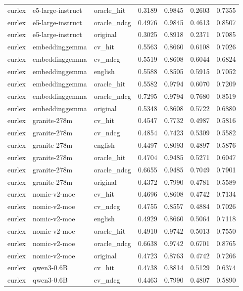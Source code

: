 \begin{tabular}{lllrrrr}
eurlex & e5-large-instruct & oracle\_hit & 0.3189 & 0.9845 & 0.2603 & 0.7355 \\
eurlex & e5-large-instruct & oracle\_ndcg & 0.4976 & 0.9845 & 0.4613 & 0.8507 \\
eurlex & e5-large-instruct & original & 0.3025 & 0.8918 & 0.2371 & 0.7085 \\
eurlex & embeddinggemma & cv\_hit & 0.5563 & 0.8660 & 0.6108 & 0.7026 \\
eurlex & embeddinggemma & cv\_ndcg & 0.5519 & 0.8608 & 0.6044 & 0.6824 \\
eurlex & embeddinggemma & english & 0.5588 & 0.8505 & 0.5915 & 0.7052 \\
eurlex & embeddinggemma & oracle\_hit & 0.5582 & 0.9794 & 0.6070 & 0.7209 \\
eurlex & embeddinggemma & oracle\_ndcg & 0.7295 & 0.9794 & 0.7680 & 0.8519 \\
eurlex & embeddinggemma & original & 0.5348 & 0.8608 & 0.5722 & 0.6880 \\
eurlex & granite-278m & cv\_hit & 0.4547 & 0.7732 & 0.4987 & 0.5816 \\
eurlex & granite-278m & cv\_ndcg & 0.4854 & 0.7423 & 0.5309 & 0.5582 \\
eurlex & granite-278m & english & 0.4497 & 0.8093 & 0.4897 & 0.5876 \\
eurlex & granite-278m & oracle\_hit & 0.4704 & 0.9485 & 0.5271 & 0.6047 \\
eurlex & granite-278m & oracle\_ndcg & 0.6655 & 0.9485 & 0.7049 & 0.7901 \\
eurlex & granite-278m & original & 0.4372 & 0.7990 & 0.4781 & 0.5589 \\
eurlex & nomic-v2-moe & cv\_hit & 0.4696 & 0.8608 & 0.4742 & 0.7134 \\
eurlex & nomic-v2-moe & cv\_ndcg & 0.4755 & 0.8557 & 0.4884 & 0.7026 \\
eurlex & nomic-v2-moe & english & 0.4929 & 0.8660 & 0.5064 & 0.7118 \\
eurlex & nomic-v2-moe & oracle\_hit & 0.4910 & 0.9742 & 0.5013 & 0.7550 \\
eurlex & nomic-v2-moe & oracle\_ndcg & 0.6638 & 0.9742 & 0.6701 & 0.8765 \\
eurlex & nomic-v2-moe & original & 0.4723 & 0.8763 & 0.4742 & 0.7266 \\
eurlex & qwen3-0.6B & cv\_hit & 0.4738 & 0.8814 & 0.5129 & 0.6374 \\
eurlex & qwen3-0.6B & cv\_ndcg & 0.4463 & 0.7990 & 0.4807 & 0.5890 \\

\end{tabular}
